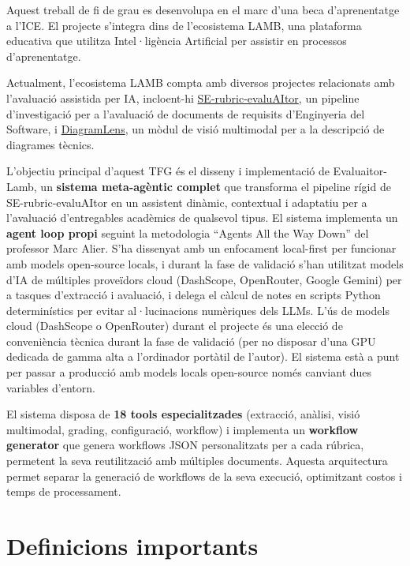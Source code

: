 \documentclass[12pt,a4paper,twoside]{report}
\begin{document}
Aquest treball de fi de grau es desenvolupa en el marc d'una beca d'aprenentatge a l'ICE. El projecte s'integra dins de l'ecosistema LAMB, una plataforma educativa que utilitza Intel·lig\`encia Artificial per assistir en processos d'aprenentatge.

Actualment, l'ecosistema LAMB compta amb diversos projectes relacionats amb l'avaluaci\'o assistida per IA, incloent-hi \href{https://github.com/Lamb-Project/SE-rubric-evaluAItor}{SE-rubric-evaluAItor}, un pipeline d'investigaci\'o per a l'avaluaci\'o de documents de requisits d'Enginyeria del Software, i \href{https://github.com/Lamb-Project/DiagramLens}{DiagramLens}, un m\`odul de visi\'o multimodal per a la descripci\'o de diagrames t\`ecnics.

L'objectiu principal d'aquest TFG \'es el disseny i implementaci\'o de Evaluaitor-Lamb, un \textbf{sistema meta-ag\`entic complet} que transforma el pipeline r\'igid de SE-rubric-evaluAItor en un assistent din\`amic, contextual i adaptatiu per a l'avaluaci\'o d'entregables acad\`emics de qualsevol tipus. El sistema implementa un \textbf{agent loop propi} seguint la metodologia ``Agents All the Way Down'' del professor Marc Alier. S’ha dissenyat amb un enfocament local-first per funcionar amb models open-source locals, i durant la fase de validació s’han utilitzat models d'IA de m\'ultiples prove\"idors cloud (DashScope, OpenRouter, Google Gemini) per a tasques d'extracci\'o i avaluaci\'o, i delega el c\`alcul de notes en scripts Python determin\'istics per evitar al·lucinacions num\`eriques dels LLMs. L'\'us de models cloud (DashScope o OpenRouter) durant el projecte \'es una elecci\'o de conveni\`encia t\`ecnica durant la fase de validaci\'o (per no disposar d'una GPU dedicada de gamma alta a l'ordinador port\`atil de l'autor). El sistema est\`a a punt per passar a producci\'o amb models locals open-source nom\'es canviant dues variables d'entorn.

El sistema disposa de \textbf{18 tools especialitzades} (extracci\'o, an\`alisi, visi\'o multimodal, grading, configuraci\'o, workflow) i implementa un \textbf{workflow generator} que genera workflows JSON personalitzats per a cada r\'ubrica, permetent la seva reutilitzaci\'o amb m\'ultiples documents. Aquesta arquitectura permet separar la generaci\'o de workflows de la seva execuci\'o, optimitzant costos i temps de processament.

\section{Definicions importants}
\label{sec:definicions}
\end{document}
